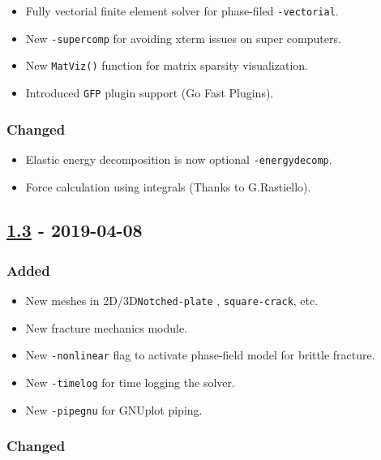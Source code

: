 \begin{itemize}
\tightlist
\item
  Fully vectorial finite element solver for phase-filed
  \lstinline!-vectorial!.
\item
  New \lstinline!-supercomp! for avoiding xterm issues on super
  computers.
\item
  New \lstinline!MatViz()! function for matrix sparsity visualization.
\item
  Introduced \lstinline!GFP! plugin support (Go Fast Plugins).
\end{itemize}

\subsubsection{Changed}\label{changed-8}

\begin{itemize}
\tightlist
\item
  Elastic energy decomposition is now optional
  \lstinline!-energydecomp!.
\item
  Force calculation using integrals (Thanks to G.Rastiello).
\end{itemize}

\subsection{\texorpdfstring{\href{https://gitlab.com/PsdSolver/psd_sources/-/tree/v1.3}{1.3}
- 2019-04-08}{1.3 - 2019-04-08}}\label{section-8}

\subsubsection{Added}\label{added-9}

\begin{itemize}
\tightlist
\item
  New meshes in 2D/3D\lstinline!Notched-plate! ,
  \lstinline!square-crack!, etc.
\item
  New fracture mechanics module.
\item
  New \lstinline!-nonlinear! flag to activate phase-field model for
  brittle fracture.
\item
  New \lstinline!-timelog! for time logging the solver.
\item
  New \lstinline!-pipegnu! for GNUplot piping.
\end{itemize}

\subsubsection{Changed}\label{changed-9}

